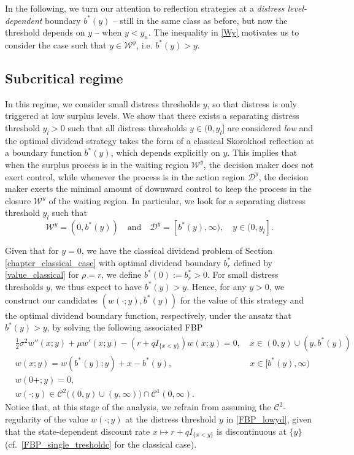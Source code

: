 \documentclass[11pt]{article} %
\numberwithin{komcounter}{section}
\numberwithin{equation}{section}
\numberwithin{theorem}{section}
\begin{document}
In the following, we turn our attention to reflection strategies at a {\it distress level-dependent} boundary $b^*(y)$ -- still in the same class as before, but now the threshold depends on $y$ -- when $y < y_u$. 
The inequality in \eqref{Wy} motivates us to consider the case such that $y \in \mathcal{W}^y$, i.e. 
$b^*(y) > y$.

\subsection{Subcritical regime} \label{sec_subcritical}

In this regime, we consider small distress thresholds $y$, so that distress is only triggered at low surplus levels. 
We show that there exists a separating distress threshold $y_l > 0$ such that all distress thresholds $y \in (0, y_l]$ are considered {\it low} and the optimal dividend strategy takes the form of a classical Skorokhod reflection at a boundary function $b^*(y)$, which depends explicitly on $y$. 
This implies that when the surplus process is in the waiting region $\mathcal{W}^y$, the decision maker does not exert control, while whenever the process is in the action region $\mathcal{D}^y$, the decision maker exerts the minimal amount of downward control to keep the process in the closure $\overline{\mathcal{W}^y}$ of the waiting region. 
In particular, we look for a separating distress threshold $y_l$ such that   
$$
\mathcal{W}^y = (0,b^*(y))
\quad \text{and} \quad 
\mathcal{D}^y = [b^*(y), \infty) , 
\quad y \in (0, y_l].
$$

Given that for $y=0$, we have the classical dividend problem of Section \ref{chapter_classical_case} with optimal dividend boundary $b_{r}^*$ defined by \eqref{value_classical} for $\rho=r$, we define $b^*(0) := b_{r}^* > 0$. 
For small distress thresholds $y$, we thus expect to have $b^*(y)>y$. 
Hence, for any $y>0$, we construct our candidates $(w(\cdot;y),b^*(y))$ for the value of this strategy and the optimal dividend boundary function, respectively, under the ansatz that $b^*(y)>y$, by solving the following associated FBP 
\begin{align}
&\tfrac12 \sigma^2 w''(x;y)+\mu w'(x;y) - (r+qI_{\{x< y\}})w(x;y) = 0, \quad x\in (0,y)\cup(y,b^*(y)) \label{FBP_lowya}\\
&w(x;y) = w(b^*(y);y) + x - b^*(y), \qquad \qquad \qquad \qquad \quad x\in [b^*(y),\infty) \label{FBP_lowyb}\\ &w(0+;y)=0, \label{FBP_lowyc}\\ 
&w(\cdot;y) \in \mathcal{C}^2 \big((0,y) \cup (y,\infty) \big) \cap  \mathcal{C}^1(0,\infty) \label{FBP_lowyd}.
\end{align}
Notice that, at this stage of the analysis, we refrain from assuming the $\mathcal{C}^2$-regularity of the value $w(\cdot;y)$ at the distress threshold $y$ in \eqref{FBP_lowyd}, given that the state-dependent discount rate $x \mapsto r+qI_{\{x< y\}}$ is discontinuous at $\{y\}$ (cf.~\eqref{FBP_single_tresholdc} for the classical case).
\end{document}
